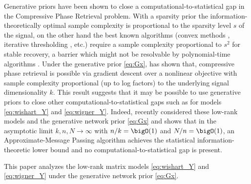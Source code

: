 Generative priors have been shown to close a computational-to-statistical gap in the Compressive Phase Retrieval problem. %
With a sparsity prior the information-theoretically optimal sample complexity is proportional to the sparsity level $s$ of the signal, on the other hand the best known algorithms (convex methods \cite{hand2016compressed,li2013sparse,ohlsson2011compressive}, iterative thresholding \cite{cai2016optimal, wang2017sparse, yuan2019phase}, etc.) require a sample complexity proportional to $s^2$ for stable recovery, a barrier which might not be resolvable by polynomial-time algorithms \cite{barbier2019optimal}.
Under the generative prior \eqref{eq:Gx}, \cite{oscar2018phase} has shown that, compressive phase retrieval is possible via gradient descent over a nonlinear objective with sample complexity proportional (up to log factors) to the underlying signal dimensionality $k$.
This result suggests that it may be possible to use generative priors to close other computational-to-statistical gaps such as for models \eqref{eq:wishart_Y} and \eqref{eq:wigner_Y}. 
Indeed, recently \cite{aubin2019spiked}
considered these low-rank models and the generative network prior \eqref{eq:Gx}
and shows that 
in the asymptotic limit $k,n,N \to \infty$ with $n/k = \bigO(1)$ 
and  $N/n = \bigO(1)$, an Approximate-Message Passing algorithm  achieves the statistical information-theoretic lower bound 
and no computational-to-statistical gap is present.  %
%



This paper analyzes the low-rank matrix models \eqref{eq:wishart_Y} and \eqref{eq:wigner_Y} under the generative network prior \eqref{eq:Gx}. 

